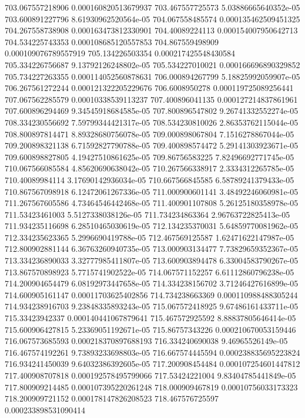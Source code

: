 {703.067557218906 0.000160820513679937
703.467557725573 5.03886665640352e-05
703.600891227796 8.61930962520564e-05
704.067558485574 0.000135462509451325
704.267558738908 0.000163473812330901
704.40089224113 0.000154007950642713
704.534225743353 0.000108685120557853
704.867559498909 0.000109076789557919
705.134226503354 0.000217425548430584
705.334226756687 9.13792126248802e-05
705.534227010021 0.000166696890329852
705.734227263355 0.000114052560878631
706.000894267799 5.18825992059907e-05
706.267561272244 0.000121322205229676
706.6008950278 0.000119725089256441
707.067562285579 0.00010338539113237
707.400896041135 0.000127214837861961
707.600896294469 9.34545918684585e-05
707.800896547802 9.26741332552274e-05
708.334230556692 7.59799344421317e-05
708.534230810026 2.86353762115044e-05
708.800897814471 8.89328680756078e-05
709.000898067804 7.1516278867044e-05
709.200898321138 6.71592827790788e-05
709.400898574472 5.29141303923671e-05
709.600898827805 4.19427510861625e-05
709.86756583225 7.82496692771745e-05
710.067566085584 4.85620690638042e-05
710.267566338917 2.3334312265785e-05
710.40089984114 3.17690142936034e-05
710.667566845585 6.58789241379433e-05
710.867567098918 6.12472061267336e-05
711.000900601141 3.48492246060981e-05
711.267567605586 4.73464546442468e-05
711.400901107808 5.26125180358978e-05
711.53423461003 5.5127338038126e-05
711.734234863364 2.96763722825413e-05
711.934235116698 6.28510465030619e-05
712.134235370031 5.64859770081962e-05
712.334235623365 5.2996690419788e-05
712.467569125587 1.62471622147987e-05
712.800902881144 6.36763260940735e-05
713.000903134477 7.73829659352367e-05
713.334236890033 3.32777985411807e-05
713.600903894478 6.33004583790267e-05
713.867570898923 5.7715741902522e-05
714.067571152257 6.61112860796238e-05
714.200904654479 6.08192973447658e-05
714.334238156702 3.71246427616899e-05
714.600905161147 0.00011703625402856
714.734238663369 0.000110988488305244
714.934238916703 9.23848335893243e-05
715.067572418925 9.67486161433711e-05
715.33423942337 0.000140441067879641
715.467572925592 8.88837805646414e-05
715.600906427815 5.23369051192671e-05
715.86757343226 0.000210670053159446
716.067573685593 0.000218370897688193
716.334240690038 9.46965526149e-05
716.467574192261 9.73893233698803e-05
716.667574445594 0.000238835695223824
716.934241450039 9.64032386392605e-05
717.200908454484 0.000107254601447812
717.400908707818 0.000192578495799066
717.53424221004 9.83404785441849e-05
717.800909214485 0.000107395220261248
718.000909467819 0.00010756033173323
718.200909721152 0.000178147826208523
718.467576725597 0.000233898531090414
}

